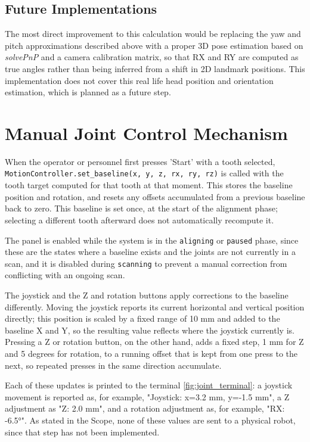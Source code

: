 \subsection{Future Implementations}

The most direct improvement to this calculation would be replacing the yaw and pitch approximations described above with a proper 3D pose estimation based on \textit{solvePnP} and a camera calibration matrix, so that RX and RY are computed as true angles rather than being inferred from a shift in 2D landmark positions. This implementation does not cover this real life head position and orientation estimation, which is planned as a future step. 

 \section{Manual Joint Control Mechanism}

When the operator or personnel first presses 'Start' with a tooth selected, \texttt{MotionController.set\_baseline(x, y, z, rx, ry, rz)} is called with the tooth target computed for that tooth at that moment. This stores the baseline position and rotation, and resets any offsets accumulated from a previous baseline back to zero. This baseline is set once, at the start of the alignment phase; selecting a different tooth afterward does not automatically recompute it.

The panel is enabled while the system is in the \texttt{aligning} or \texttt{paused} phase, since these are the states where a baseline exists and the joints are not currently in a scan, and it is disabled during \texttt{scanning} to prevent a manual correction from conflicting with an ongoing scan.

The joystick and the Z and rotation buttons apply corrections to the baseline differently. Moving the joystick reports its current horizontal and vertical position directly; this position is scaled by a fixed range of 10 mm and added to the baseline X and Y, so the resulting value reflects where the joystick currently is. Pressing a Z or rotation button, on the other hand, adds a fixed step, 1 mm for Z and 5 degrees for rotation, to a running offset that is kept from one press to the next, so repeated presses in the same direction accumulate.

Each of these updates is printed to the terminal \autoref{fig:joint_terminal}: a joystick movement is reported as, for example, "Joystick: x=3.2 mm, y=-1.5 mm", a Z adjustment as "Z: 2.0 mm", and a rotation adjustment as, for example, "RX: -6.5°". As stated in the Scope, none of these values are sent to a physical robot, since that step has not been implemented.

